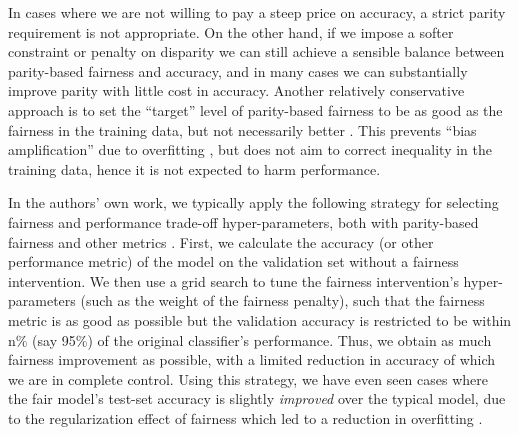 \documentclass[11pt,dvipdfm]{article}
\begin{document}
In cases where we are not willing to pay a steep price on accuracy, a strict parity requirement is not appropriate.  On the other hand, if we impose a softer constraint or penalty on disparity we can still achieve a sensible balance between parity-based fairness and accuracy, and in many cases we can substantially improve parity with little cost in accuracy.  Another relatively conservative approach is to set the ``target'' level of parity-based fairness to be as good as the fairness in the training data, but not necessarily better \cite{foulds2020intersectional}.  This prevents ``bias amplification'' due to overfitting \cite{zhao2017men}, but does not aim to correct inequality in the training data, hence it is not expected to harm performance. 

In the authors' own work, we typically apply the following strategy for selecting fairness and performance  trade-off hyper-parameters, both with parity-based fairness and other metrics \cite{foulds2020intersectional}.  First, we calculate the accuracy (or other performance metric) of the model on the validation set without a fairness intervention.  We then use a grid search to tune the fairness intervention's hyper-parameters (such as the weight of the fairness penalty), such that the fairness metric is as good as possible but the validation accuracy is restricted to be within n\%  (say 95\%) 
of the original classifier's performance.  Thus, we obtain as much fairness improvement as possible, with a limited reduction in accuracy of which we are in complete control.  Using this strategy, we have even seen cases where the fair model's test-set accuracy is slightly \emph{improved} over the typical model, due to the regularization effect of fairness which led to a reduction in overfitting \cite{keya2020equitable}. %

\end{document}
